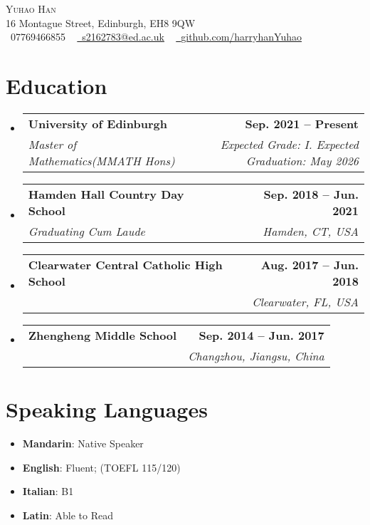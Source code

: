 \documentclass[letterpaper,11pt]{article}
\makeatletter
\newcommand{\resumeSubheading}[4]{
  \vspace{-2pt}\item
    \begin{tabular*}{1.0\textwidth}[t]{l@{\extracolsep{\fill}}r}
      \textbf{#1} & \textbf{\small #2} \\
      \textit{\small#3} & \textit{\small #4} \\
    \end{tabular*}\vspace{-7pt}
}
\newcommand{\resumeSubHeadingListStart}{\begin{itemize}[leftmargin=0.0in, label={}]}
\newcommand{\resumeSubHeadingListEnd}{\end{itemize}}
\makeatother
\begin{document}

\begin{center}
    {\Huge \scshape Yuhao Han} \\ \vspace{1pt}
    16 Montague Street, Edinburgh, EH8 9QW
    \\ \vspace{1pt}
    \small \raisebox{-0.1\height}\faPhone\ 07769466855 ~ \href{mailto:s2162783@ed.ac.uk}{\raisebox{-0.2\height}\faEnvelope\  \underline{s2162783@ed.ac.uk}} ~ 
    \href{https://github.com/harryhanYuhao}{\raisebox{-0.2\height}\faGithub\ \underline{github.com/harryhanYuhao}}
    \vspace{-8pt}
\end{center}


\section{Education}
  \resumeSubHeadingListStart
    \resumeSubheading
      {University of Edinburgh}{Sep. 2021 -- Present}
      {Master of Mathematics(MMATH Hons)}{Expected Grade: I. Expected Graduation: May 2026}
    \resumeSubheading
      {Hamden Hall Country Day School}{Sep. 2018 -- Jun. 2021}
      {Graduating Cum Laude}{Hamden, CT, USA}
    \resumeSubheading
      {Clearwater Central Catholic High School}{Aug. 2017 -- Jun. 2018}
      {}{Clearwater, FL, USA}
    \resumeSubheading
      {Zhengheng Middle School}{Sep. 2014 -- Jun. 2017}
      {}{Changzhou, Jiangsu, China}
  \resumeSubHeadingListEnd

\section{Speaking Languages}
\begin{multicols}{2}
\begin{itemize}[itemsep=-5pt, parsep=3pt]
    \item \small   \textbf{Mandarin}: Native Speaker
    \item    \textbf{English}: Fluent; (TOEFL 115/120) 
    \item    \textbf{Italian}: B1 
    \item    \textbf{Latin}: Able to Read
  \end{itemize}
 \end{multicols}
\end{document}
